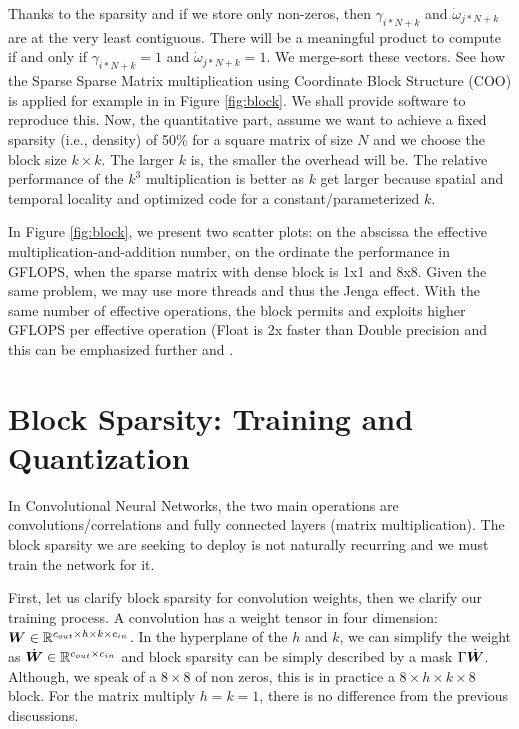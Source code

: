 \documentclass[sigconf]{acmart}
\begin{document}
Thanks to the sparsity and if we store only non-zeros, then
$\gamma_{i*N+k}$ and $\dot{\omega}_{j*N+k}$ are at the very least
contiguous. There will be a meaningful product to compute if and only
if $\gamma_{i*N+k} =1$ and  $\dot{\omega}_{j*N+k} =1$.  We merge-sort
these vectors.  See how the Sparse Sparse Matrix multiplication using
Coordinate Block Structure (COO) is applied for example in
in Figure \ref{fig:block}. We shall provide software to reproduce this. %
Now, the quantitative part, assume we want to
achieve a fixed sparsity (i.e., density) of 50\% for a square matrix
of size $N$ and we choose the block size $k \times k$. The larger $k$
is, the smaller the overhead will be.  The relative performance of the
$k^3$ multiplication is better as $k$ get larger because spatial and
temporal locality and optimized code for a constant/parameterized $k$.


In Figure \ref{fig:block}, we present two scatter plots: on the
abscissa the effective multiplication-and-addition number, on the
ordinate the performance in GFLOPS, when the sparse matrix with dense
block is 1x1 and 8x8. Given the same problem, we may use more threads
and thus the Jenga effect.  With the same number of effective
operations, the block permits and exploits higher GFLOPS per effective
operation (Float is 2x faster than Double precision and this can be
emphasized further \cite{Gray2017GPUKF,li2023popsparse} and \cite{pmlr-v119-kurtz20a} .



\section{Block Sparsity: Training and Quantization}
\label{sec:training}

In Convolutional Neural Networks, the two main operations are
convolutions/correlations and fully connected layers (matrix
multiplication). The block sparsity we are seeking to deploy is not
naturally recurring and  we must train the network for it.

First, let us clarify block sparsity for convolution weights, then we
clarify our training process. A convolution has a weight tensor in
four dimension: ${\boldsymbol W} \in \mathbb{R}^{c_{out}\times h \times k \times
  c_{in}}$. In the hyperplane of the $h$ and $k$, 
  we can simplify the weight as $\dot{{\boldsymbol W}} \in \mathbb{R}^{c_{out}
  \times c_{in}}$ and block sparsity can be simply described by a mask
$\Gamma\dot{{\boldsymbol W}}$. Although, we speak of a $8\times 8$ of non
zeros, this is in practice a $8\times h\times k\times 8$ block. For
the matrix multiply $h=k=1$, there is no difference from the
previous discussions.
\end{document}
